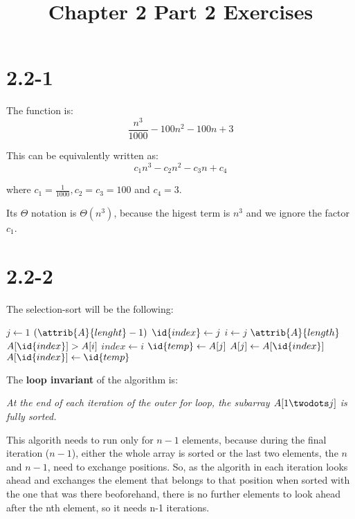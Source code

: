 \documentclass{article}
\title{Chapter 2 Part 2 Exercises}
\begin{document}
\date{}
\author{}

\maketitle

\section*{2.2-1}

The function is:
\begin{equation*}
  \frac{n^3}{1000} - 100 n^2 - 100 n + 3
\end{equation*}

This can be equivalently written as:
\begin{equation*}
  c_1 {n^3} - c_2 n^2 - c_3 n + c_4
\end{equation*}

where $c_1 = \frac{1}{1000}, c_2 = c_3 = 100$ and $c_4 = 3$.

Its $\Theta$ notation is $\Theta(n^3)$, because the higest term is $n^3$ and we ignore the factor $c_1$.

\section*{2.2-2}

The selection-sort will be the following:

\begin{codebox}
  \li \For $j \gets 1$ \To $(\attrib{A}{lenght}-1)$
  \li   \Do            
        $\id{index} \gets j$
  \li   \For $i \gets j$ \To $\attrib{A}{length}$
  \li     \If $A[\id{index}] > A[i]$
  \li       \Then
              $index \gets i$
            \End
        \End
  \li     $\id{temp} \gets A[j]$
  \li     $A[j] \gets A[\id{index}]$
  \li   $A[\id{index}] \gets \id{temp}$
      \End
\end{codebox}

The \textbf{loop invariant} of the algorithm is: 

\begin{center} \textit{
  At the end of each iteration of the outer for loop, the subarray $A[1 \twodots j]$ is fully sorted. }
\end{center}

This algorith needs to run only for $n-1$ elements, because during the final iteration ($n-1$), either the whole array is sorted or the last two elements, the $n$ and $n-1$, need to exchange positions. So, as the algorith in each iteration looks ahead and exchanges the element that belongs to that position when sorted with the one that was there beoforehand, there is no further elements to look ahead after the nth element, so it needs n-1 iterations.
\end{document}
